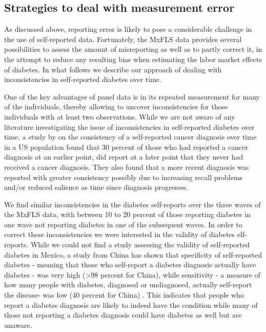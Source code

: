 \documentclass[12pt,english,british]{article}
\providecommand{\tabularnewline}{\\}
\begin{document}
\providecommand{\tabularnewline}{\\}

\subsection{Strategies to deal with measurement error}

As discussed above, reporting error is likely to pose a considerable
challenge in the use of self-reported data. Fortunately, the \ac{MxFLS}
data provides several possibilities to assess the amount of misreporting
as well as to partly correct it, in the attempt to reduce any resulting
bias when estimating the labor market effects of diabetes. In what
follows we describe our approach of dealing with inconsistencies in
self-reported diabetes over time.

One of the key advantages of panel data is in its repeated measurement
for many of the individuals, thereby allowing to uncover inconsistencies
for those individuals with at least two observations. While we are
not aware of any literature investigating the issue of inconsistencies
in self-reported diabetes over time, a study by \citet{Zajacova2010}
on the consistency of a self-reported cancer diagnosis over time in
a US population found that 30 percent of those who had reported a
cancer diagnosis at an earlier point, did report at a later point
that they never had received a cancer diagnosis. They also found that
a more recent diagnosis was reported with greater consistency possibly
due to increasing recall problems and/or reduced salience as time
since diagnosis progresses.

We find similar inconsistencies in the diabetes self-reports over
the three waves of the \ac{MxFLS} data, with between 10 to 20 percent
of those reporting diabetes in one wave not reporting diabetes in
one of the subsequent waves. In order to correct these inconsistencies we were interested in the validity of diabetes elf-reports. While we could not find a study assessing
the validity of self-reported diabetes in Mexico, a study from China
has shown that specificity of self-reported diabetes - meaning that
those who self-report a diabetes diagnosis actually have diabetes
- was very high (>98 percent for China), while sensitivity - a measure
of how many people with diabetes, diagnosed or undiagnosed, actually
self-report the disease- was low (40 percent for China) \citep{Yuan2015}.
This indicates that people who report a diabetes diagnosis are likely
to indeed have the condition while many of those not reporting
a diabetes diagnosis could have diabetes as well but are unaware.
\end{document}
